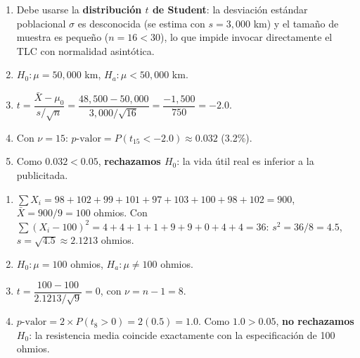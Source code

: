 \begin{solproblema}[prob:f6ad523]
	\begin{enumerate}
		\item Debe usarse la \textbf{distribución $t$ de Student}: la desviación estándar poblacional $\sigma$ es desconocida (se estima con $s=3,000$ km) y el tamaño de muestra es pequeño ($n=16<30$), lo que impide invocar directamente el TLC con normalidad asintótica.
		\item $H_0: \mu = 50,000$ km, $H_a: \mu < 50,000$ km.
		\item $t = \dfrac{\bar{X}-\mu_0}{s/\sqrt{n}} = \dfrac{48,500-50,000}{3,000/\sqrt{16}} = \dfrac{-1,500}{750} = -2.0$.
		\item Con $\nu=15$: $p\text{-valor} = P(t_{15}<-2.0) \approx 0.032$ (3.2\%).
		\item Como $0.032 < 0.05$, \textbf{rechazamos $H_0$}: la vida útil real es inferior a la publicitada.
	\end{enumerate}
\end{solproblema}

\begin{solproblema}
	\begin{enumerate}
		\item $\sum X_i = 98+102+99+101+97+103+100+98+102=900$, $\bar{X}=900/9=100$ ohmios. Con $\sum(X_i-100)^2 = 4+4+1+1+9+9+0+4+4=36$: $s^2 = 36/8=4.5$, $s=\sqrt{4.5}\approx2.1213$ ohmios.
		\item $H_0: \mu=100$ ohmios, $H_a: \mu\neq100$ ohmios.
		\item $t = \dfrac{100-100}{2.1213/\sqrt9} = 0$, con $\nu=n-1=8$.
		\item $p\text{-valor} = 2\times P(t_8>0) = 2(0.5)=1.0$. Como $1.0>0.05$, \textbf{no rechazamos $H_0$}: la resistencia media coincide exactamente con la especificación de 100 ohmios.
	\end{enumerate}
\end{solproblema}


